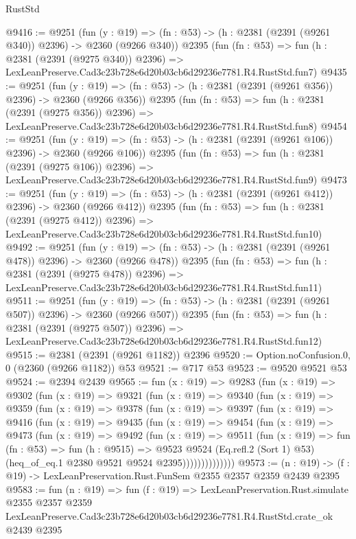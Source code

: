 \begin{lexlean}{RustStd}
\begin{coremodule}
@9416 := @9251
    (fun (y : @19) => (fn : @53) -> (h : @2381 (@2391 (@9261 @340)) @2396) -> @2360 (@9266 @340))
    @2395
    (fun (fn : @53) =>
    fun (h : @2381 (@2391 (@9275 @340)) @2396) =>
    LexLeanPreserve.Cad3c23b728e6d20b03cb6d29236e7781.R4.RustStd.fun7)
@9435 := @9251
    (fun (y : @19) => (fn : @53) -> (h : @2381 (@2391 (@9261 @356)) @2396) -> @2360 (@9266 @356))
    @2395
    (fun (fn : @53) =>
    fun (h : @2381 (@2391 (@9275 @356)) @2396) =>
    LexLeanPreserve.Cad3c23b728e6d20b03cb6d29236e7781.R4.RustStd.fun8)
@9454 := @9251
    (fun (y : @19) => (fn : @53) -> (h : @2381 (@2391 (@9261 @106)) @2396) -> @2360 (@9266 @106))
    @2395
    (fun (fn : @53) =>
    fun (h : @2381 (@2391 (@9275 @106)) @2396) =>
    LexLeanPreserve.Cad3c23b728e6d20b03cb6d29236e7781.R4.RustStd.fun9)
@9473 := @9251
    (fun (y : @19) => (fn : @53) -> (h : @2381 (@2391 (@9261 @412)) @2396) -> @2360 (@9266 @412))
    @2395
    (fun (fn : @53) =>
    fun (h : @2381 (@2391 (@9275 @412)) @2396) =>
    LexLeanPreserve.Cad3c23b728e6d20b03cb6d29236e7781.R4.RustStd.fun10)
@9492 := @9251
    (fun (y : @19) => (fn : @53) -> (h : @2381 (@2391 (@9261 @478)) @2396) -> @2360 (@9266 @478))
    @2395
    (fun (fn : @53) =>
    fun (h : @2381 (@2391 (@9275 @478)) @2396) =>
    LexLeanPreserve.Cad3c23b728e6d20b03cb6d29236e7781.R4.RustStd.fun11)
@9511 := @9251
    (fun (y : @19) => (fn : @53) -> (h : @2381 (@2391 (@9261 @507)) @2396) -> @2360 (@9266 @507))
    @2395
    (fun (fn : @53) =>
    fun (h : @2381 (@2391 (@9275 @507)) @2396) =>
    LexLeanPreserve.Cad3c23b728e6d20b03cb6d29236e7781.R4.RustStd.fun12)
@9515 := @2381 (@2391 (@9261 @1182)) @2396
@9520 := Option.noConfusion.{0, 0} (@2360 (@9266 @1182)) @53
@9521 := @717 @53
@9523 := @9520 @9521 @53
@9524 := @2394 @2439
@9565 := fun (x : @19) =>
  @9283
    (fun (x : @19) =>
    @9302
      (fun (x : @19) =>
      @9321
        (fun (x : @19) =>
        @9340
          (fun (x : @19) =>
          @9359
            (fun (x : @19) =>
            @9378
              (fun (x : @19) =>
              @9397
                (fun (x : @19) =>
                @9416
                  (fun (x : @19) =>
                  @9435
                    (fun (x : @19) =>
                    @9454
                      (fun (x : @19) =>
                      @9473
                        (fun (x : @19) =>
                        @9492
                          (fun (x : @19) =>
                          @9511
                            (fun (x : @19) =>
                            fun (fn : @53) =>
                            fun (h : @9515) =>
                            @9523
                              @9524
                              (Eq.refl.{2} (Sort 1) @53)
                              (heq_of_eq.{1} @2380 @9521 @9524 @2395))))))))))))))
@9573 := (n : @19) -> (f : @19) -> LexLeanPreservation.Rust.FunSem @2355 @2357 @2359 @2439 @2395
@9583 := fun (n : @19) =>
  fun (f : @19) =>
  LexLeanPreservation.Rust.simulate
    @2355
    @2357
    @2359
    LexLeanPreserve.Cad3c23b728e6d20b03cb6d29236e7781.R4.RustStd.crate_ok
    @2439
    @2395
\end{coremodule}
\end{lexlean}
